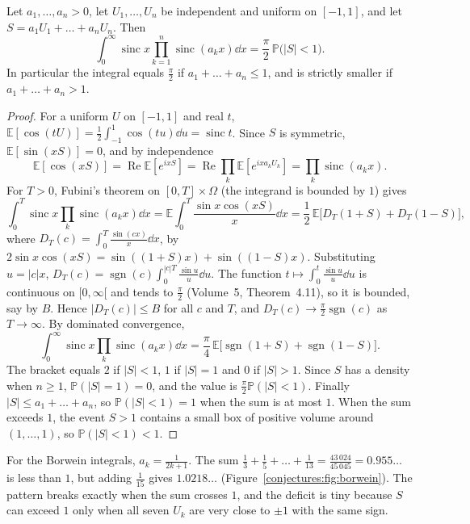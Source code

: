 \begin{theorem}\label{conjectures:thm:borwein}
Let $a_1,\dots,a_n>0$, let $U_1,\dots,U_n$ be independent and uniform on $[-1,1]$, and let $S=a_1U_1+\dots+a_nU_n$. Then
\[
\int_0^\infty\operatorname{sinc}x\prod_{k=1}^n\operatorname{sinc}(a_kx)\dd x=\frac\pi2\,\mathbb P\bigl(|S|<1\bigr).
\]
In particular the integral equals $\frac\pi2$ if $a_1+\dots+a_n\le1$, and is strictly smaller if $a_1+\dots+a_n>1$.
\end{theorem}
\begin{proof}
For a uniform $U$ on $[-1,1]$ and real $t$, $\mathbb E[\cos(tU)]=\frac12\int_{-1}^1\cos(tu)\dd u=\operatorname{sinc}t$. Since $S$ is symmetric,
$\mathbb E[\sin(xS)]=0$, and by independence
\[
\mathbb E[\cos(xS)]=\operatorname{Re}\mathbb E[e^{ixS}]=\operatorname{Re}\prod_k\mathbb E[e^{ixa_kU_k}]=\prod_k\operatorname{sinc}(a_kx).
\]
For $T>0$, Fubini's theorem on $[0,T]\times\Omega$ (the integrand is bounded by $1$) gives
\[
\int_0^T\operatorname{sinc}x\prod_k\operatorname{sinc}(a_kx)\dd x=\mathbb E\int_0^T\frac{\sin x\cos(xS)}x\dd x=\frac12\,\mathbb E\bigl[D_T(1+S)+D_T(1-S)\bigr],
\]
where $D_T(c)=\int_0^T\frac{\sin(cx)}x\dd x$, by $2\sin x\cos(xS)=\sin((1+S)x)+\sin((1-S)x)$. Substituting $u=|c|x$, $D_T(c)=\operatorname{sgn}(c)\int_0^{|c|T}\frac{\sin u}u\dd u$.
The function $t\mapsto\int_0^t\frac{\sin u}u\dd u$ is continuous on $[0,\infty[$ and tends to $\frac\pi2$ (Volume~5, Theorem~4.11), so it is bounded, say by $B$.
Hence $|D_T(c)|\le B$ for all $c$ and $T$, and $D_T(c)\to\frac\pi2\operatorname{sgn}(c)$ as $T\to\infty$. By dominated convergence,
\[
\int_0^\infty\operatorname{sinc}x\prod_k\operatorname{sinc}(a_kx)\dd x=\frac\pi4\,\mathbb E\bigl[\operatorname{sgn}(1+S)+\operatorname{sgn}(1-S)\bigr].
\]
The bracket equals $2$ if $|S|<1$, $1$ if $|S|=1$ and $0$ if $|S|>1$. Since $S$ has a density when $n\ge1$, $\mathbb P(|S|=1)=0$, and the value is
$\frac\pi2\mathbb P(|S|<1)$. Finally $|S|\le a_1+\dots+a_n$, so $\mathbb P(|S|<1)=1$ when the sum is at most $1$. When the sum exceeds $1$, the event
$S>1$ contains a small box of positive volume around $(1,\dots,1)$, so $\mathbb P(|S|<1)<1$.
\end{proof}

For the Borwein integrals, $a_k=\frac1{2k+1}$. The sum $\frac13+\frac15+\dots+\frac1{13}=\frac{43\,024}{45\,045}=0.955\ldots$ is less than $1$, but adding $\frac1{15}$
gives $1.0218\ldots$ (Figure~\ref{conjectures:fig:borwein}). The pattern breaks exactly when the sum crosses $1$, and the deficit is tiny because $S$ can exceed $1$ only
when all seven $U_k$ are very close to $\pm1$ with the same sign.

